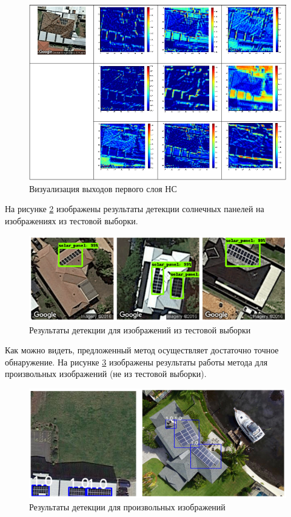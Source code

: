\begin{figure}[!ht]
	\centering
	\includegraphics[width=16cm]{man-source/images/ch4/pic4-24.png}
	\caption{Визуализация выходов первого слоя НС}
	\label{fig:pic4-24}
\end{figure}

На рисунке \ref{fig:test_results} изображены результаты детекции солнечных панелей на изображениях из тестовой выборки.

\begin{figure}[!ht]
	\centering
	\includegraphics[width=16cm]{man-source/images/ch4/pic4-22.png}
	\caption{Результаты детекции для изображений из тестовой выборки}
	\label{fig:test_results}
\end{figure}

Как можно видеть, предложенный метод осуществляет достаточно точное обнаружение. На рисунке \ref{fig:random_results} изображены результаты работы метода для произвольных изображений (не из тестовой выборки).

\begin{figure}[!ht]
	\centering
	\includegraphics[width=16cm]{man-source/images/ch4/pic4-23.png}
	\caption{Результаты детекции для произвольных изображений}
	\label{fig:random_results}
\end{figure}

